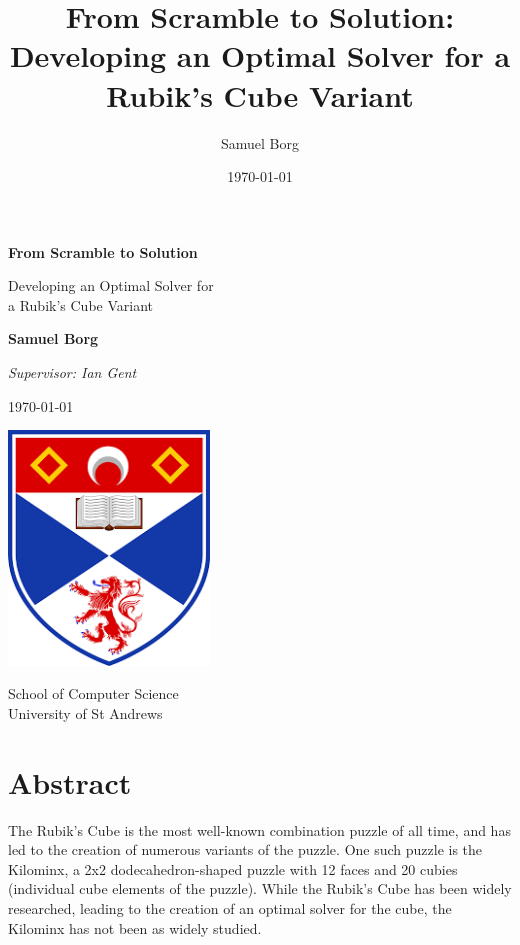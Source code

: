 \documentclass[12pt]{report}
\title{From Scramble to Solution: Developing an Optimal Solver for a Rubik's Cube Variant}
\author{Samuel Borg}
\date{\today}
\begin{document}
\begin{titlepage}
    \begin{center}
        \vspace*{1.5cm}
            
        \Huge
        \textbf{From Scramble to Solution}
            
        \vspace{0.5cm}
        \LARGE
        Developing an Optimal Solver for \\a Rubik's Cube Variant

        \vspace{2cm}
        \textbf{Samuel Borg}

        \Large
        \textit{Supervisor: Ian Gent}

        \vspace{0.5cm}

        \large
        \today

        \vspace{3cm}

        \includegraphics[width=0.4\textwidth]{unilogo}

        \Large
        \vspace{0.5cm}
        School of Computer Science\\
        University of St Andrews
    \end{center}
\end{titlepage}

\chapter*{Abstract}
The Rubik's Cube is the most well-known combination puzzle of all time, and has led to the creation of numerous variants of the puzzle. One such puzzle is the Kilominx, a 2x2 dodecahedron-shaped puzzle with 12 faces and 20 cubies (individual cube elements of the puzzle). While the Rubik's Cube has been widely researched, leading to the creation of an optimal solver for the cube, the Kilominx has not been as widely studied.
\end{document}
